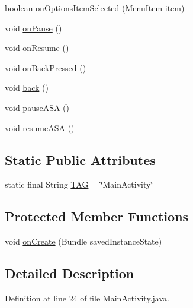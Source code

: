 \begin{DoxyCompactItemize}
boolean \hyperlink{classpt_1_1lsts_1_1asa_1_1activities_1_1MainActivity_aac910e332ec19db85bba0edf9ca0e05b}{on\+Options\+Item\+Selected} (Menu\+Item item)
\item 
void \hyperlink{classpt_1_1lsts_1_1asa_1_1activities_1_1MainActivity_a918322b0740f63d2ecbba8db91dcc83c}{on\+Pause} ()
\item 
void \hyperlink{classpt_1_1lsts_1_1asa_1_1activities_1_1MainActivity_a296d2c803dd6fb75981dad46749de38c}{on\+Resume} ()
\item 
void \hyperlink{classpt_1_1lsts_1_1asa_1_1activities_1_1MainActivity_a789121bd0dc29a97f7cb17d400e3ff31}{on\+Back\+Pressed} ()
\item 
void \hyperlink{classpt_1_1lsts_1_1asa_1_1activities_1_1MainActivity_a7406007ebe336052e5ec821f57798959}{back} ()
\item 
void \hyperlink{classpt_1_1lsts_1_1asa_1_1activities_1_1MainActivity_a129af89fa887445f09ef261630bdce7b}{pause\+A\+S\+A} ()
\item 
void \hyperlink{classpt_1_1lsts_1_1asa_1_1activities_1_1MainActivity_add8081c3c78a8b9d7aacd0d928d45976}{resume\+A\+S\+A} ()
\end{DoxyCompactItemize}
\subsection*{Static Public Attributes}
\begin{DoxyCompactItemize}
\item 
static final String \hyperlink{classpt_1_1lsts_1_1asa_1_1activities_1_1MainActivity_a6bf94fc26340460c59818c12bd15c2c3}{T\+A\+G} = \char`\"{}Main\+Activity\char`\"{}
\end{DoxyCompactItemize}
\subsection*{Protected Member Functions}
\begin{DoxyCompactItemize}
\item 
void \hyperlink{classpt_1_1lsts_1_1asa_1_1activities_1_1MainActivity_a520b490bc56d03a12ae164e224cf2e08}{on\+Create} (Bundle saved\+Instance\+State)
\end{DoxyCompactItemize}


\subsection{Detailed Description}


Definition at line 24 of file Main\+Activity.\+java.



